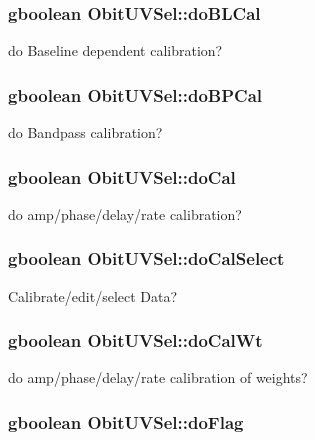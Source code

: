 \subsubsection{\setlength{\rightskip}{0pt plus 5cm}gboolean {\bf Obit\-UVSel::do\-BLCal}}\label{structObitUVSel_o36}


do Baseline dependent calibration? 

\subsubsection{\setlength{\rightskip}{0pt plus 5cm}gboolean {\bf Obit\-UVSel::do\-BPCal}}\label{structObitUVSel_o38}


do Bandpass calibration? 

\subsubsection{\setlength{\rightskip}{0pt plus 5cm}gboolean {\bf Obit\-UVSel::do\-Cal}}\label{structObitUVSel_o42}


do amp/phase/delay/rate calibration? 

\subsubsection{\setlength{\rightskip}{0pt plus 5cm}gboolean {\bf Obit\-UVSel::do\-Cal\-Select}}\label{structObitUVSel_o20}


Calibrate/edit/select Data? 

\subsubsection{\setlength{\rightskip}{0pt plus 5cm}gboolean {\bf Obit\-UVSel::do\-Cal\-Wt}}\label{structObitUVSel_o43}


do amp/phase/delay/rate calibration of weights? 

\subsubsection{\setlength{\rightskip}{0pt plus 5cm}gboolean {\bf Obit\-UVSel::do\-Flag}}\label{structObitUVSel_o46}


